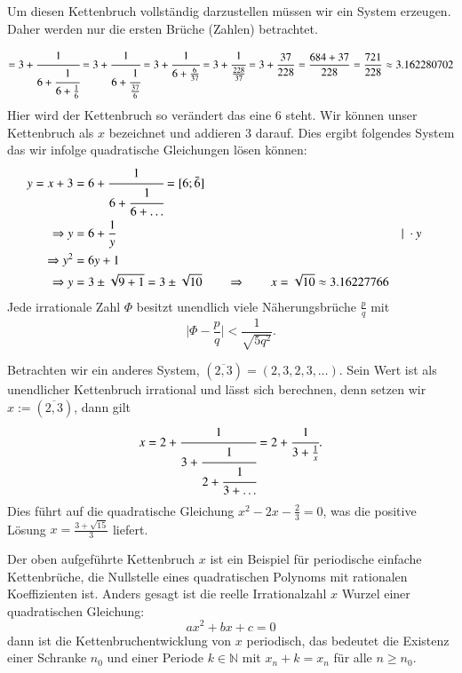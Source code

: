 Um diesen Kettenbruch vollständig darzustellen müssen wir ein System
erzeugen. Daher werden nur die ersten Brüche (Zahlen) betrachtet.

\begin{equation}
[3;6;6;6]
=
3 + \cfrac{1}{6+\cfrac{1}{6+\frac{1}{6}}}
=
3 + \cfrac{1}{6+\cfrac{1}{\frac{37}{6}}}
=
3 + \cfrac{1}{6+\frac{6}{37}}
=
3 + \cfrac{1}{\frac{228}{37}}
=
3 + \frac{37}{228}
=
\frac{684+37}{228}
=
\frac{721}{228}
\approx
3.162280702
\end{equation}
Hier wird der Kettenbruch so verändert das eine 6 steht.
Wir können unser Kettenbruch als $x$ bezeichnet und addieren 3
darauf. Dies ergibt folgendes System das wir infolge quadratische
Gleichungen lösen können:
\begin{align*}
y = x+3 &= 6 + \cfrac{1}{6+\cfrac{1}{6+\dots}} = [6;\bar{6}]
\\
\Rightarrow y &= 6 + \frac{1}{y}	&&\vert\;\cdot y
\\
\Rightarrow y^2 &= 6y + 1
\\
\Rightarrow y &= 3\pm \sqrt{9+1} = 3 \pm \sqrt{10}\qquad\Rightarrow\qquad x = \sqrt{10}
\approx
3.16227766
\end{align*}
Jede irrationale Zahl $\Phi$ besitzt unendlich viele Näherungsbrüche
$\frac{p}{q}$ mit
\begin{equation}
\biggl|\Phi-\frac{p}{q}\biggr|<\frac{1}{\sqrt{5 q^2}}.
\end{equation}

Betrachten wir ein anderes System, $(\overline{2,3}) =  (2,3,2,3,\dots)$.
Sein Wert ist als unendlicher Kettenbruch irrational und lässt sich
berechnen, denn setzen wir $x:=(\overline{2,3})$, dann gilt
\begin{equation}
x
=
2 + \cfrac{1}{3+\cfrac{1}{2+\cfrac{1}{3+\dots}}}
=
2 + \cfrac{1}{3+\frac{1}{x}}.
\end{equation}
Dies führt auf die quadratische Gleichung $x^2 - 2x - \frac{2}{3}
= 0$, was die positive Lösung $x = \frac{3+\sqrt{15}}{3}$ liefert.

Der oben aufgeführte Kettenbruch $x$ ist ein Beispiel für periodische
einfache Kettenbrüche, die Nullstelle eines quadratischen Polynoms
mit rationalen Koeffizienten ist. Anders gesagt ist die reelle
Irrationalzahl $x$ Wurzel einer quadratischen Gleichung:
\begin{equation}
ax^2 + bx + c = 0
\end{equation}
dann ist die Kettenbruchentwicklung von $x$ periodisch, das bedeutet
die Existenz einer Schranke $n_0$ und einer Periode $k \in \mathbb{N}$
mit $x_n+k = x_n$ für alle $n\ge n_0$.

